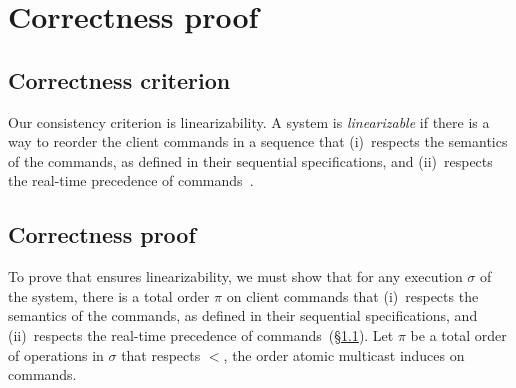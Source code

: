 \appendix %

\chapter{Correctness proof}
\label{sec:correctness}

\newcommand{\tsc}{\ensuremath{t^{cli}_{start}}}
\newcommand{\tec}{\ensuremath{t^{cli}_{end}}}
\newcommand{\tes}{\ensuremath{t^{srv}_{end}}}
\newcommand{\tss}{\ensuremath{t^{srv}_{start}}}

\section{Correctness criterion}
\label{sec:correctcrit}

Our consistency criterion is linearizability.  A system is \emph{linearizable}
if there is a way to reorder the client commands in a sequence that (i)~respects
the semantics of the commands, as defined in their sequential specifications,
and (ii)~respects the real-time precedence of commands~\cite{Attiya04}.

\section{Correctness proof}
To prove that \dynastar ensures linearizability, we must show that for any
execution $\sigma$ of the system, there is a total order $\pi$ on client
commands that (i)~respects the semantics of the commands, as defined in their
sequential specifications, and (ii)~respects the real-time precedence of
commands~(\S\ref{sec:correctcrit}).
%
Let $\pi$ be a total order of operations in $\sigma$ that respects $<$, the
order atomic multicast induces on commands.

